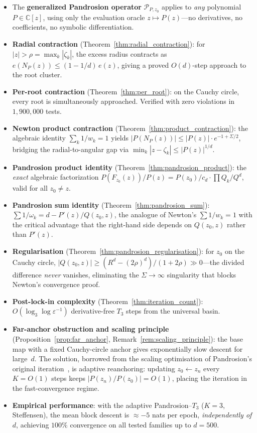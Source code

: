 \documentclass[11pt,a4paper]{article}
\theoremstyle{definition}
\newcommand{\CC}{\mathbb{C}}
\begin{document}
\begin{itemize}
  \item The \textbf{generalized Pandrosion operator} $\mathcal{P}_{P,z_0}$ applies to \emph{any} polynomial $P \in \CC[z]$, using only the evaluation oracle $z \mapsto P(z)$---no derivatives, no coefficients, no symbolic differentiation.
  \item \textbf{Radial contraction} (Theorem~\ref{thm:radial_contraction}): for $|z| > \rho = \max_k|\zeta_k|$, the excess radius contracts as $e(N_P(z)) \leq (1 - 1/d)\,e(z)$, giving a proved $O(d)$-step approach to the root cluster.
  \item \textbf{Per-root contraction} (Theorem~\ref{thm:per_root}): on the Cauchy circle, every root is simultaneously approached.  Verified with zero violations in $1{,}900{,}000$ tests.
  \item \textbf{Newton product contraction} (Theorem~\ref{thm:product_contraction}): the algebraic identity $\sum_k 1/w_k = 1$ yields $|P(N_P(z))| \leq |P(z)|\cdot e^{-1+\Sigma/2}$, bridging the radial-to-angular gap via $\min_k|z-\zeta_k| \leq |P(z)|^{1/d}$.
  \item \textbf{Pandrosion product identity} (Theorem~\ref{thm:pandrosion_product}): the \emph{exact} algebraic factorization $P(F_{z_0}(z))/P(z) = P(z_0)/c_d \cdot \prod Q_k / Q^d$, valid for all $z_0 \neq z$.
  \item \textbf{Pandrosion sum identity} (Theorem~\ref{thm:pandrosion_sum}): $\sum 1/\omega_k = d - P'(z)/Q(z_0,z)$, the analogue of Newton's $\sum 1/w_k = 1$ with the critical advantage that the right-hand side depends on $Q(z_0,z)$ rather than $P'(z)$.
  \item \textbf{Regularisation} (Theorem~\ref{thm:pandrosion_regularisation}): for $z_0$ on the Cauchy circle, $|Q(z_0,z)| \geq (R^d-(2\rho)^d)/(1+2\rho) \gg 0$---the divided difference \emph{never} vanishes, eliminating the $\Sigma \to \infty$ singularity that blocks Newton's convergence proof.
  \item \textbf{Post-lock-in complexity} (Theorem~\ref{thm:iteration_count}): $O(\log_3\!\log\varepsilon^{-1})$ derivative-free $T_3$ steps from the universal basin.
  \item \textbf{Far-anchor obstruction and scaling principle} (Proposition~\ref{prop:far_anchor}, Remark~\ref{rem:scaling_principle}): the base map with a fixed Cauchy-circle anchor gives exponentially slow descent for large~$d$.  The solution, borrowed from the scaling optimisation of Pandrosion's original iteration~\cite{besevic2026}, is adaptive reanchoring: updating $z_0 \leftarrow z_n$ every $K = O(1)$ steps keeps $|P(z_n)/P(z_0)| = O(1)$, placing the iteration in the fast-convergence regime.
  \item \textbf{Empirical performance}: with the adaptive Pandrosion--$T_3$ ($K=3$, Steffensen), the mean block descent is $\approx -5$ nats per epoch, \emph{independently of $d$}, achieving $100\%$ convergence on all tested families up to $d = 500$.
\end{itemize}
\end{document}
